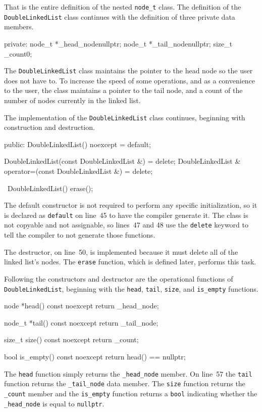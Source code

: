 \documentclass{article}
\begin{document}
  That is the entire definition of the nested \verb|node_t| class. The definition of the \verb|DoubleLinkedList| class continues with the definition of three private data members.
  \begin{lstcpp}
private:
  node_t *_head_node{nullptr};
  node_t *_tail_node{nullptr};
  size_t  _count{0};\end{lstcpp}
  The \verb|DoubleLinkedList| class maintains the pointer to the head node so the user does not have to. To increase the speed of some operations, and as a convenience to the user, the class maintains a pointer to the tail node, and a count of the number of nodes currently in the linked list.

  The implementation of the \verb|DoubleLinkedList| class continues, beginning with construction and destruction.
  \begin{lstcpp}
public:
  DoubleLinkedList() noexcept = default;

  DoubleLinkedList(const DoubleLinkedList &) = delete;
  DoubleLinkedList & operator=(const DoubleLinkedList &) = delete;

  ~DoubleLinkedList() {
    erase();
  }\end{lstcpp}
  The default constructor is not required to perform any specific initialization, so it is declared as \verb|default| on line~45 to have the compiler generate it. The class is not copyable and not assignable, so lines~47 and 48 use the \verb|delete| keyword to tell the compiler to not generate those functions.

  The destructor, on line~50, is implemented because it must delete all of the linked list's nodes. The \verb|erase| function, which is defined later, performs this task.

  Following the constructors and destructor are the operational functions of \verb|DoubleLinkedList|, beginning with the \verb|head|, \verb|tail|, \verb|size|, and \verb|is_empty| functions.

  \begin{lstcpp}
  node *head() const noexcept {
    return _head_node;
  }

  node_t *tail() const noexcept {
    return _tail_node;
  }

  size_t size() const noexcept {
    return _count;
  }

  bool is_empty() const noexcept {
    return head() == nullptr;
  }\end{lstcpp}
  The \verb|head| function simply returns the \verb|_head_node| member. On line~57 the \verb|tail| function returns the \verb|_tail_node| data member. The \verb|size| function returns the \verb|_count| member and the \verb|is_empty| function returns a \verb|bool| indicating whether the \verb|_head_node| is equal to \verb|nullptr|.
\end{document}
